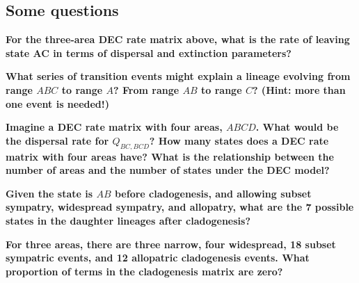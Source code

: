 \subsection*{Some questions}

{\bf {} For the three-area DEC rate matrix above, what is the rate of leaving state AC in terms of dispersal and extinction parameters?}

{\bf {} What series of transition events might explain a lineage evolving from range $ABC$ to range $A$? From range $AB$ to range $C$? (Hint: more than one event is needed!)}

{ \bf {} Imagine a DEC rate matrix with four areas, $ABCD$. What would be the dispersal rate for $Q_{BC,BCD}$? How many states does a DEC rate matrix with four areas have? What is the relationship between the number of areas and the number of states under the DEC model? }

{\bf {} Given the state is $AB$ before cladogenesis, and allowing subset sympatry, widespread sympatry, and allopatry, what are the 7 possible states in the daughter lineages after cladogenesis?}

{\bf {} For three areas, there are three narrow, four widespread, 18 subset sympatric events, and 12 allopatric cladogenesis events. What proportion of terms in the cladogenesis matrix are zero?}




\newpage
